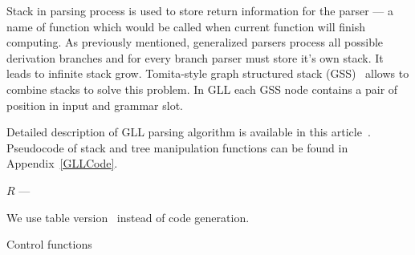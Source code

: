 Stack in parsing process is used to store return information for the parser --- a name of function which would be called when current function will finish computing. 
As previously mentioned, generalized parsers process all possible derivation branches and for every branch parser must store it's own stack. It leads to infinite stack grow.  
Tomita-style graph structured stack (GSS)~\cite{Tomita} allows to combine stacks to solve this problem.
In GLL each GSS node contains a pair of position in input and grammar slot. 

Detailed description of GLL parsing algorithm is available in this article~\cite{GLL}. Pseudocode of stack and tree manipulation functions can be found in Appendix~\ref{GLLCode}.

$R$ ---   

We use table version~\cite{TableGLL} instead of code generation.

\begin{algorithm}[h]
\begin{algorithmic}[1]
\caption{Control functions}
\label{mainFunctions}
  \Else
  \EndIf
\EndFunction

       \Else 
       \EndIf
       \EndIf
  \EndCase
       \EndFor
  \EndCase
  \EndCase
  \EndCase
  \EndSwitch
\EndFunction

      \Else
      \EndIf
  \EndWhile
\EndFunction

\end{algorithmic}
\end{algorithm}

